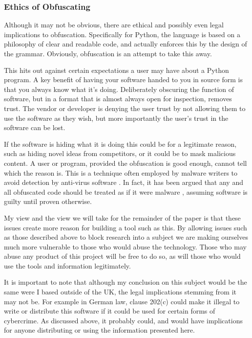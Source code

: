 \documentclass[twoside,a4paper]{report}
\begin{document}
\subsubsection{Ethics of Obfuscating}

Although it may not be obvious, there are ethical and possibly even legal implications to obfuscation.
Specifically for Python, the language is based on a philosophy of clear and readable code, and actually
enforces this by the design of the grammar. Obviously, obfuscation is an attempt to take this away.

This hits out against certain expectations a user may have about a Python program. A key benefit of having your
software handed to you in source form is that you always know what it's doing. Deliberately obscuring the
function of software, but in a format that is almost always open for inspection, removes trust. The vendor or developer is
denying the user trust by not allowing them to use the software as they wish, but more importantly the user's
trust in the software can be lost.

If the software is hiding what it is doing this could be for a legitimate reason, such as hiding novel ideas
from competitors, or it could be to mask malicious content. A user or program, provided the obfuscation is
good enough, cannot tell which the reason is. This is a technique often employed by malware
writers to avoid detection by anti-virus software \cite{dycodeobf}. In fact, it has been argued that any and
all obfuscated code should be treated as if it were malware \cite{noobf}, assuming software is guilty until
proven otherwise.

My view and the view we will take for the remainder of the paper is that these issues create more reason for
building a tool such as this. By allowing issues such as those described above to block research into a subject
we are making ourselves much more vulnerable to those who would abuse the technology. Those who may abuse any
product of this project will be free to do so, as will those who would use the tools and information legitimately.

It is important to note that although my conclusion on this subject would be the same were I based outside of
the UK, the legal implications stemming from it may not be. For example in German law, clause 202(c) \cite{202c}
could make it illegal to write or distribute this software if it could be used for
certain forms of cybercrime. As discussed above, it probably could, and would have implications for anyone distributing
or using the information presented here.
\end{document}
